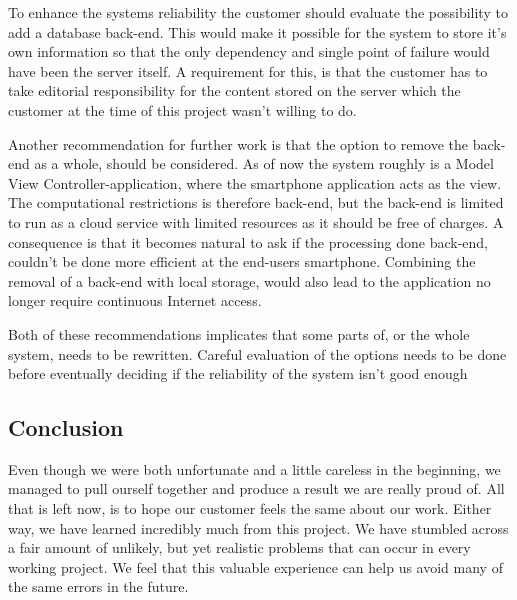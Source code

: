 To enhance the systems reliability the customer should evaluate the possibility to add a database back-end. This would make it possible for the system to store it's own information so that the only dependency and single point of failure would have been the server itself. A requirement for this, is that the customer has to take editorial responsibility for the content stored on the server which the customer at the time of this project wasn't willing to do.

Another recommendation for further work is that the option to remove the back-end as a whole, should be considered. As of now the system roughly is a Model View Controller-application, where the smartphone application acts as the view. The computational restrictions is therefore back-end, but the back-end is limited to run as a cloud service with limited resources as it should be free of charges. A consequence is that it becomes natural to ask if the processing done back-end, couldn't be done more efficient at the end-users smartphone. Combining the removal of a back-end with local storage, would also lead to the application no longer require continuous Internet access.

Both of these recommendations implicates that some parts of, or the whole system, needs to be rewritten. Careful evaluation of the options needs to be done before eventually deciding if the reliability of the system isn't good enough

\subsection{Conclusion}

Even though we were both unfortunate and a little careless in the beginning, we managed to pull ourself together and produce a result we are really proud of. All that is left now, is to hope our customer feels the same about our work. Either way, we have learned incredibly much from this project. We have stumbled across a fair amount of unlikely, but yet realistic problems that can occur in every working project. We feel that this valuable experience can help us avoid many of the same errors in the future.